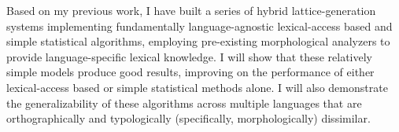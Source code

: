 Based on my previous work, I have built a series of hybrid lattice-generation systems implementing fundamentally language-agnostic lexical-access based and simple statistical algorithms, employing pre-existing morphological analyzers to provide language-specific lexical knowledge. I will show that these relatively simple models produce good results, improving on the performance of either lexical-access based or simple statistical methods alone. I will also demonstrate the generalizability of these algorithms across multiple languages that are orthographically and typologically (specifically, morphologically) dissimilar.